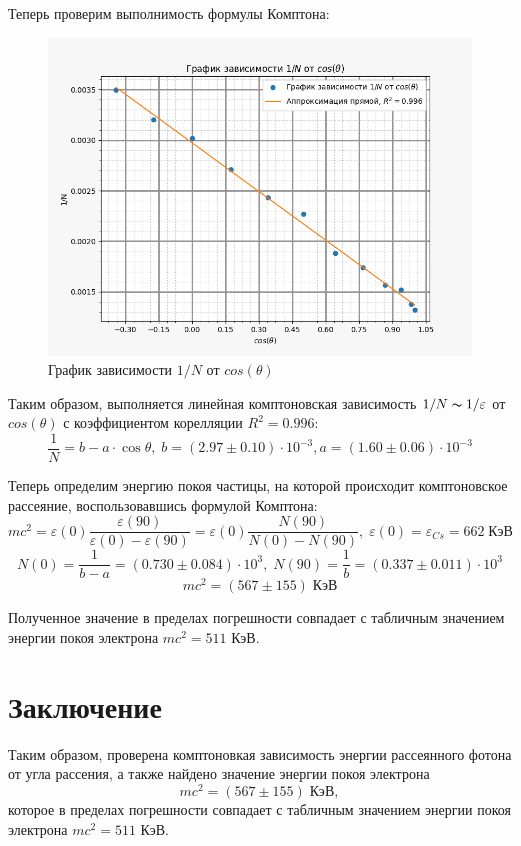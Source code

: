 	Теперь проверим выполнимость формулы Комптона:

	\begin{figure}[H]
		\centering
		\includegraphics[width = 12 cm]{images/N_inv_theta}
		\caption{График зависимости $1/N$ от $cos(\theta)$}
		\label{N_inv_theta}
	\end{figure}

	Таким образом, выполняется линейная комптоновская зависимость $1/N \thicksim 1/\varepsilon$ от $cos(\theta)$ с коэффициентом корелляции $R^2 = 0.996$:
	\begin{equation}
		\frac{1}{N} = b - a \cdot \cos \theta, \; b = (2.97 \pm 0.10) \cdot 10^{-3}, a = (1.60 \pm 0.06) \cdot 10^{-3}
	\end{equation}

	Теперь определим энергию покоя частицы, на которой происходит комптоновское рассеяние, воспользовавшись формулой Комптона:
	\begin{equation}
		mc^2 = \varepsilon(0) \frac{\varepsilon(90)}{\varepsilon(0) - \varepsilon(90)} = \varepsilon(0) \frac{N(90)}{N(0) - N(90)}, \; \varepsilon(0) = \varepsilon_{Cs} = 662 \; \text{КэВ}
	\end{equation}
	\begin{equation*}
		N(0) = \frac{1}{b - a} = (0.730 \pm 0.084) \cdot 10^3, \; N(90) = \frac{1}{b} = (0.337 \pm 0.011) \cdot 10^3
	\end{equation*}
	\begin{equation}
		mc^2 = (567 \pm 155) \; \text{КэВ}
	\end{equation}

	Полученное значение в пределах погрешности совпадает с табличным значением энергии покоя электрона $mc^2 = 511$ КэВ.

\section{Заключение}

	Таким образом, проверена комптоновкая зависимость энергии рассеянного фотона от угла рассения, а также найдено значение энергии покоя электрона
	\begin{equation}
		mc^2 = (567 \pm 155) \; \text{КэВ},
	\end{equation}
	которое в пределах погрешности совпадает с табличным значением энергии покоя электрона $mc^2 = 511$ КэВ.